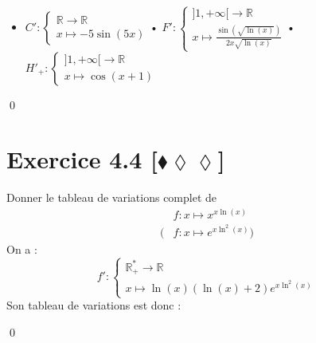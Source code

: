 \documentclass[10pt]{article}
\begin{document}
\begin{tcolorbox}[enhanced, width=7in, center, size=fbox, fontupper=\large, drop shadow southwest]
\begin{itemize}
        \item $C':\begin{cases}\mathbb{R}\rightarrow\mathbb{R}\\x\mapsto-5\sin(5x)\end{cases}$\hspace{1.0cm}• $F':\begin{cases}]1,+\infty[\rightarrow\mathbb{R}\\x\mapsto\frac{\sin(\sqrt{\ln(x)})}{2x\sqrt{\ln(x)}}\end{cases}$\hspace{1.6cm}• $H'_+:\begin{cases}]1,+\infty[\rightarrow\mathbb{R}\\x\mapsto\cos(x+1)\end{cases}$
    \end{itemize}
    \qed
\end{tcolorbox}

\section*{Exercice 4.4 [$\blacklozenge\lozenge\lozenge$]}
\begin{tcolorbox}[enhanced, width=7in, center, size=fbox, fontupper=\large, drop shadow southwest]
    Donner le tableau de variations complet de
    \begin{align*}
        &f:x\mapsto x^{x\ln(x)}\\
        (& f:x\mapsto e^{x\ln^2(x)})
    \end{align*}
    On a  :
    \begin{equation*}
        f':\begin{cases}\mathbb{R}_+^*\rightarrow\mathbb{R}\\x\mapsto\ln(x)(\ln(x)+2)e^{x\ln^2(x)}\end{cases}
    \end{equation*}
    Son tableau de variations est donc :
    \begin{center}
    \end{center}
    \qed
\end{tcolorbox}
\end{document}
